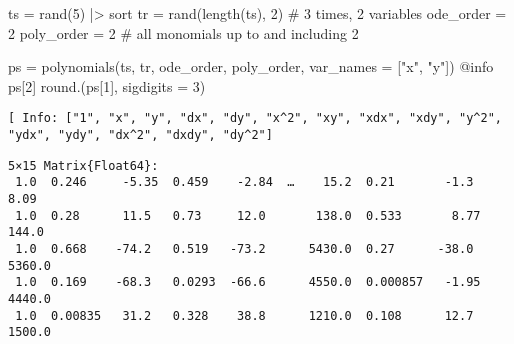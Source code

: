 \documentclass[
]{article}
\newenvironment{Shaded}{\begin{snugshade}}{\end{snugshade}}
\newcommand{\CommentTok}[1]{\textcolor[rgb]{0.37,0.37,0.37}{#1}}
\newcommand{\FloatTok}[1]{\textcolor[rgb]{0.68,0.00,0.00}{#1}}
\newcommand{\FunctionTok}[1]{\textcolor[rgb]{0.28,0.35,0.67}{#1}}
\newcommand{\NormalTok}[1]{\textcolor[rgb]{0.00,0.23,0.31}{#1}}
\newcommand{\OperatorTok}[1]{\textcolor[rgb]{0.37,0.37,0.37}{#1}}
\newcommand{\PreprocessorTok}[1]{\textcolor[rgb]{0.68,0.00,0.00}{#1}}
\newcommand{\StringTok}[1]{\textcolor[rgb]{0.13,0.47,0.30}{#1}}
\begin{document}
\begin{Shaded}
\begin{Highlighting}[]
\NormalTok{ts }\OperatorTok{=} \FunctionTok{rand}\NormalTok{(}\FloatTok{5}\NormalTok{) }\OperatorTok{|\textgreater{}}\NormalTok{ sort}
\NormalTok{tr }\OperatorTok{=} \FunctionTok{rand}\NormalTok{(}\FunctionTok{length}\NormalTok{(ts),  }\FloatTok{2}\NormalTok{) }\CommentTok{\# 3 times, 2 variables}
\NormalTok{ode\_order }\OperatorTok{=} \FloatTok{2}
\NormalTok{poly\_order }\OperatorTok{=} \FloatTok{2} \CommentTok{\# all monomials up to and including 2}

\NormalTok{ps }\OperatorTok{=} \FunctionTok{polynomials}\NormalTok{(ts, tr, ode\_order, poly\_order, var\_names }\OperatorTok{=}\NormalTok{ [}\StringTok{"x"}\NormalTok{, }\StringTok{"y"}\NormalTok{])}
\PreprocessorTok{@info}\NormalTok{ ps[}\FloatTok{2}\NormalTok{]}
\FunctionTok{round}\NormalTok{.(ps[}\FloatTok{1}\NormalTok{], sigdigits }\OperatorTok{=} \FloatTok{3}\NormalTok{)}
\end{Highlighting}
\end{Shaded}

\begin{verbatim}
[ Info: ["1", "x", "y", "dx", "dy", "x^2", "xy", "xdx", "xdy", "y^2", "ydx", "ydy", "dx^2", "dxdy", "dy^2"]
\end{verbatim}

\begin{verbatim}
5×15 Matrix{Float64}:
 1.0  0.246     -5.35  0.459    -2.84  …    15.2  0.21       -1.3      8.09
 1.0  0.28      11.5   0.73     12.0       138.0  0.533       8.77   144.0
 1.0  0.668    -74.2   0.519   -73.2      5430.0  0.27      -38.0   5360.0
 1.0  0.169    -68.3   0.0293  -66.6      4550.0  0.000857   -1.95  4440.0
 1.0  0.00835   31.2   0.328    38.8      1210.0  0.108      12.7   1500.0
\end{verbatim}

\clearpage
\end{document}
